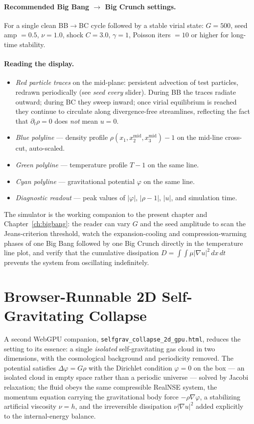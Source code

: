 \paragraph{Recommended Big Bang $\to$ Big Crunch settings.}
For a single clean BB$\to$BC cycle followed by a stable virial state:
$G = 500$, seed amp $= 0.5$, $\nu = 1.0$, shock $C = 3.0$, $\gamma = 1$,
Poisson iters $= 10$ or higher for long-time stability.

\paragraph{Reading the display.}
\begin{itemize}
\item \emph{Red particle traces} on the mid-plane: persistent advection
of test particles, redrawn periodically (see \emph{seed every} slider).
During BB the traces radiate outward; during BC they sweep inward;
once virial equilibrium is reached they continue to circulate along
divergence-free streamlines, reflecting the fact that
$\partial_t\rho = 0$ does \emph{not} mean $u = 0$.
\item \emph{Blue polyline} --- density profile $\rho(x_1, x_2^{\mathrm{mid}}, x_3^{\mathrm{mid}})-1$ on the mid-line cross-cut, auto-scaled.
\item \emph{Green polyline} --- temperature profile $T-1$ on the same line.
\item \emph{Cyan polyline} --- gravitational potential $\varphi$ on the same line.
\item \emph{Diagnostic readout} --- peak values of $|\varphi|$, $|\rho-1|$, $|u|$, and simulation time.
\end{itemize}

The simulator is the working companion to the present chapter and
Chapter~\ref{ch:bigbang}: the reader can vary $G$ and the seed amplitude
to scan the Jeans-criterion threshold, watch the
expansion-cooling and compression-warming phases of one Big Bang
followed by one Big Crunch directly in the temperature line plot, and
verify that the cumulative dissipation $D = \int\!\int\mu|\nabla u|^2\,dx\,dt$
prevents the system from oscillating indefinitely.

\section{Browser-Runnable 2D Self-Gravitating Collapse}\label{sec:selfgrav_2d_gpu}

A second WebGPU companion, \texttt{selfgrav\_collapse\_2d\_gpu.html}, reduces
the setting to its essence: a single \emph{isolated} self-gravitating gas cloud
in two dimensions, with the cosmological background and periodicity removed. The
potential satisfies $\Delta\varphi = G\rho$ with the Dirichlet condition
$\varphi = 0$ on the box --- an isolated cloud in empty space rather than a
periodic universe --- solved by Jacobi relaxation; the fluid obeys the same
compressible RealNSE system, the momentum equation carrying the gravitational body
force $-\rho\nabla\varphi$, a stabilizing artificial viscosity $\nu = h$, and the
irreversible dissipation $\nu|\nabla u|^2$ added explicitly to the
internal-energy balance.


